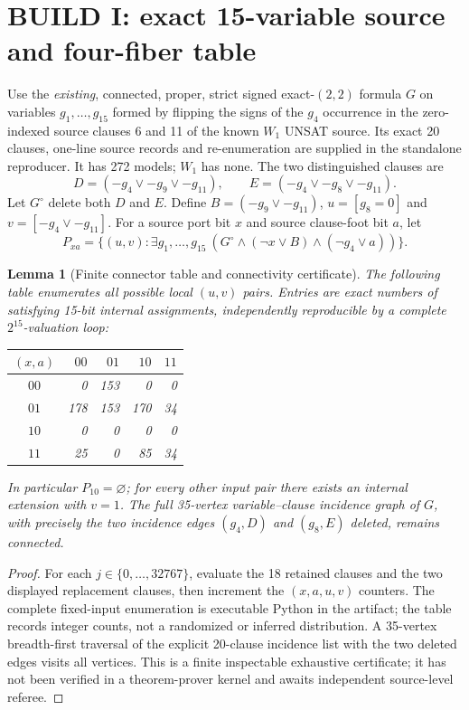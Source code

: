 \documentclass[10pt]{article}
\newtheorem{lemma}[theorem]{Lemma}
\begin{document}
\section{BUILD I: exact 15-variable source and four-fiber table}
Use the \emph{existing}, connected, proper, strict signed exact-$(2,2)$ formula $G$ on variables $g_1,\ldots,g_{15}$ formed by flipping the signs of the $g_4$ occurrence in the zero-indexed source clauses 6 and 11 of the known $W_1$ UNSAT source. Its exact 20 clauses, one-line source records and re-enumeration are supplied in the standalone reproducer. It has 272 models; $W_1$ has none. The two distinguished clauses are
\[
 D=(-g_4\vee-g_9\vee-g_{11}),\qquad E=(-g_4\vee-g_8\vee-g_{11}).
\]
Let $G^\circ$ delete both $D$ and $E$. Define $B=(-g_9\vee-g_{11})$, $u=[g_8=0]$ and $v=[-g_4\vee-g_{11}]$. For a source port bit $x$ and source clause-foot bit $a$, let
\[
 P_{xa}=\{(u,v):\exists g_1,\ldots,g_{15}\ (G^\circ\wedge(\neg x\vee B)\wedge(\neg g_4\vee a))\}.
\]
\begin{lemma}[Finite connector table and connectivity certificate]\label{lem:table}
The following table enumerates all possible local $(u,v)$ pairs. Entries are exact numbers of satisfying 15-bit internal assignments, independently reproducible by a complete $2^{15}$-valuation loop:
\begin{center}\begin{tabular}{c|rrrr}
\toprule $(x,a)$ & $00$ & $01$ & $10$ & $11$\\\midrule
$00$ & 0&153&0&0\\
$01$ &178&153&170&34\\
$10$ &0&0&0&0\\
$11$ &25&0&85&34\\\bottomrule
\end{tabular}\end{center}
In particular $P_{10}=\varnothing$; for every other input pair there exists an internal extension with $v=1$. The full 35-vertex variable--clause incidence graph of $G$, with precisely the two incidence edges $(g_4,D)$ and $(g_8,E)$ deleted, remains connected.
\end{lemma}
\begin{proof}
For each $j\in\{0,\ldots,32767\}$, evaluate the 18 retained clauses and the two displayed replacement clauses, then increment the $(x,a,u,v)$ counters. The complete fixed-input enumeration is executable Python in the artifact; the table records integer counts, not a randomized or inferred distribution. A 35-vertex breadth-first traversal of the explicit 20-clause incidence list with the two deleted edges visits all vertices. This is a finite inspectable exhaustive certificate; it has not been verified in a theorem-prover kernel and awaits independent source-level referee.\end{proof}
\end{document}
